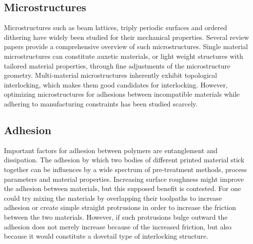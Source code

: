 \subsection{Microstructures}
Microstructures such as beam lattices, triply periodic surfaces and ordered dithering have widely been studied for their mechanical properties.
Several review papers provide a comprehensive overview of such microstructures.\cite{Cadman2013,Zhang2018a,tamburrino2018}
Single material microstructures can constitute auxetic materials, %
or light weight structures with tailored material properties, through fine adjustments of the microstructure geometry. %
Multi-material microstructures inherently exhibit topological interlocking, which makes them good candidates for interlocking\cite{freund2019determination}.
However, optimizing microstructures for adhesions between incompatible materials while adhering to  manufacturing constraints has been studied scarcely.



\subsection{Adhesion}

Important factors for adhesion between polymers are entanglement and dissipation\cite{abbott2015adhesion}.
The adhesion by which two bodies of different  printed material stick together can be influences by a wide spectrum of pre-treatment methods, process parameters and material properties\cite{freund2019determination}.
Increasing surface roughness might improve the adhesion between materials\cite{huttenbach1991interface,gent1990model}, but this supposed benefit is contested\cite{abbott2015adhesion}.
For  one could try mixing the materials by overlapping their toolpaths to increase adhesion or create simple straight protrusions in order to increase the friction between the two materials\cite{tamburrino19}.
However, if such protrusions bulge outward the adhesion does not merely increase because of the increased friction, but also because it would constitute a dovetail type of interlocking structure.



